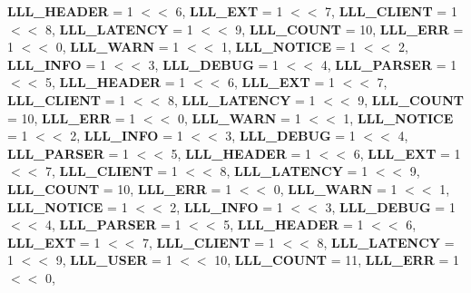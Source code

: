 \begin{DoxyCompactItemize}
{\bfseries L\+L\+L\+\_\+\+H\+E\+A\+D\+ER} = 1 $<$$<$ 6, 
{\bfseries L\+L\+L\+\_\+\+E\+XT} = 1 $<$$<$ 7, 
{\bfseries L\+L\+L\+\_\+\+C\+L\+I\+E\+NT} = 1 $<$$<$ 8, 
{\bfseries L\+L\+L\+\_\+\+L\+A\+T\+E\+N\+CY} = 1 $<$$<$ 9, 
\newline
{\bfseries L\+L\+L\+\_\+\+C\+O\+U\+NT} = 10, 
{\bfseries L\+L\+L\+\_\+\+E\+RR} = 1 $<$$<$ 0, 
{\bfseries L\+L\+L\+\_\+\+W\+A\+RN} = 1 $<$$<$ 1, 
{\bfseries L\+L\+L\+\_\+\+N\+O\+T\+I\+CE} = 1 $<$$<$ 2, 
\newline
{\bfseries L\+L\+L\+\_\+\+I\+N\+FO} = 1 $<$$<$ 3, 
{\bfseries L\+L\+L\+\_\+\+D\+E\+B\+UG} = 1 $<$$<$ 4, 
{\bfseries L\+L\+L\+\_\+\+P\+A\+R\+S\+ER} = 1 $<$$<$ 5, 
{\bfseries L\+L\+L\+\_\+\+H\+E\+A\+D\+ER} = 1 $<$$<$ 6, 
\newline
{\bfseries L\+L\+L\+\_\+\+E\+XT} = 1 $<$$<$ 7, 
{\bfseries L\+L\+L\+\_\+\+C\+L\+I\+E\+NT} = 1 $<$$<$ 8, 
{\bfseries L\+L\+L\+\_\+\+L\+A\+T\+E\+N\+CY} = 1 $<$$<$ 9, 
{\bfseries L\+L\+L\+\_\+\+C\+O\+U\+NT} = 10, 
\newline
{\bfseries L\+L\+L\+\_\+\+E\+RR} = 1 $<$$<$ 0, 
{\bfseries L\+L\+L\+\_\+\+W\+A\+RN} = 1 $<$$<$ 1, 
{\bfseries L\+L\+L\+\_\+\+N\+O\+T\+I\+CE} = 1 $<$$<$ 2, 
{\bfseries L\+L\+L\+\_\+\+I\+N\+FO} = 1 $<$$<$ 3, 
\newline
{\bfseries L\+L\+L\+\_\+\+D\+E\+B\+UG} = 1 $<$$<$ 4, 
{\bfseries L\+L\+L\+\_\+\+P\+A\+R\+S\+ER} = 1 $<$$<$ 5, 
{\bfseries L\+L\+L\+\_\+\+H\+E\+A\+D\+ER} = 1 $<$$<$ 6, 
{\bfseries L\+L\+L\+\_\+\+E\+XT} = 1 $<$$<$ 7, 
\newline
{\bfseries L\+L\+L\+\_\+\+C\+L\+I\+E\+NT} = 1 $<$$<$ 8, 
{\bfseries L\+L\+L\+\_\+\+L\+A\+T\+E\+N\+CY} = 1 $<$$<$ 9, 
{\bfseries L\+L\+L\+\_\+\+C\+O\+U\+NT} = 10, 
{\bfseries L\+L\+L\+\_\+\+E\+RR} = 1 $<$$<$ 0, 
\newline
{\bfseries L\+L\+L\+\_\+\+W\+A\+RN} = 1 $<$$<$ 1, 
{\bfseries L\+L\+L\+\_\+\+N\+O\+T\+I\+CE} = 1 $<$$<$ 2, 
{\bfseries L\+L\+L\+\_\+\+I\+N\+FO} = 1 $<$$<$ 3, 
{\bfseries L\+L\+L\+\_\+\+D\+E\+B\+UG} = 1 $<$$<$ 4, 
\newline
{\bfseries L\+L\+L\+\_\+\+P\+A\+R\+S\+ER} = 1 $<$$<$ 5, 
{\bfseries L\+L\+L\+\_\+\+H\+E\+A\+D\+ER} = 1 $<$$<$ 6, 
{\bfseries L\+L\+L\+\_\+\+E\+XT} = 1 $<$$<$ 7, 
{\bfseries L\+L\+L\+\_\+\+C\+L\+I\+E\+NT} = 1 $<$$<$ 8, 
\newline
{\bfseries L\+L\+L\+\_\+\+L\+A\+T\+E\+N\+CY} = 1 $<$$<$ 9, 
{\bfseries L\+L\+L\+\_\+\+U\+S\+ER} = 1 $<$$<$ 10, 
{\bfseries L\+L\+L\+\_\+\+C\+O\+U\+NT} = 11, 
{\bfseries L\+L\+L\+\_\+\+E\+RR} = 1 $<$$<$ 0, 
\newline

\end{DoxyCompactItemize}
